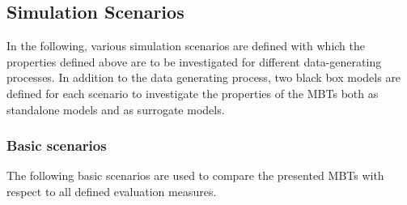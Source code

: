 \color{black}

\subsection{Simulation Scenarios}
In the following, various simulation scenarios are defined with which the properties defined above are to be investigated for different data-generating processes. In addition to the data generating process, two black box models are defined for each scenario to investigate the properties of the MBTs both as standalone models and as surrogate models.


\subsubsection{Basic scenarios}

The following basic scenarios are used to compare the presented MBTs with respect to all defined evaluation measures.




